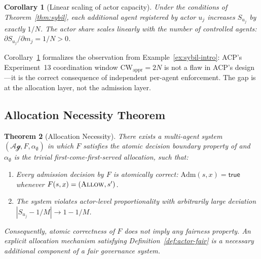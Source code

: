 \documentclass[11pt]{article}
\theoremstyle{plain}
\newtheorem{theorem}{Theorem}[section]
\newtheorem{corollary}[theorem]{Corollary}
\theoremstyle{definition}
\theoremstyle{remark}
\newcommand{\Allow}{\textsc{Allow}}
\newcommand{\Adm}{\mathrm{Adm}}
\newcommand{\Agents}{\mathcal{Ag}}         %
\newcommand{\Share}[1]{S_{#1}}             %
\newcommand{\alloc}{\alpha}                %
\begin{document}
\begin{corollary}[Linear scaling of actor capacity]
\label{cor:linear-scaling}
Under the conditions of Theorem~\ref{thm:sybil}, each additional
agent registered by actor $u_j$ increases $\Share{u_j}$ by exactly
$1/N$.  The actor share scales linearly with the number of controlled
agents: $\partial \Share{u_j} / \partial m_j = 1/N > 0$.
\end{corollary}

Corollary~\ref{cor:linear-scaling} formalizes the observation from
Example~\ref{ex:sybil-intro}: ACP's Experiment~13 coordination window
$\mathrm{CW}_{\mathrm{appr}} = 2N$ is not a flaw in ACP's design---it
is the correct consequence of independent per-agent enforcement.  The
gap is at the allocation layer, not the admission layer.

\subsection{Allocation Necessity Theorem}

\begin{theorem}[Allocation Necessity]
\label{thm:necessity}
There exists a multi-agent system $(\Agents, F, \alloc_{\emptyset})$
in which $F$ satisfies the atomic decision boundary property of
\citet{fernandez2026a} and $\alloc_{\emptyset}$ is the trivial
first-come-first-served allocation, such that:
\begin{enumerate}[label=(\roman*)]
  \item Every admission decision by $F$ is atomically correct:
    $\Adm(s, x) = \mathsf{true}$ whenever $F(s, x) = (\Allow, s')$.
  \item The system violates actor-level proportionality with
    arbitrarily large deviation $|\Share{u_j} - 1/M| \to 1 - 1/M$.
\end{enumerate}
Consequently, atomic correctness of $F$ does not imply any fairness
property.  An explicit allocation mechanism satisfying
Definition~\ref{def:actor-fair} is a \emph{necessary additional
component} of a fair governance system.
\end{theorem}
\end{document}
